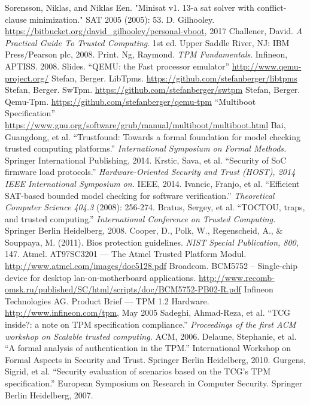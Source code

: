 \documentclass[12pt,lot, lof]{puthesis}
\begin{document}
\begin{flushleft}
\begin{footnotesize}
\begin{thebibliography}{\kern\bibindent}
    Sorensson, Niklas, and Niklas Een. "Minisat v1. 13-a sat solver with conflict-clause minimization." SAT 2005 (2005): 53.
    D. Gilhooley. \url{https://bitbucket.org/david\_gilhooley/personal-vboot}, 2017
    Challener, David. \textit{A Practical Guide To Trusted Computing}. 1st ed. Upper Saddle River, NJ: IBM Press/Pearson plc, 2008. Print.
    Ng, Raymond. \textit{TPM Fundamentals}. Infineon, APTISS. 2008. Slides.
    ``QEMU: the Fast processor emulator'' \url{http://www.qemu-project.org/}
    Stefan, Berger. LibTpms. \url{https://github.com/stefanberger/libtpms}
    Stefan, Berger. SwTpm. \url{https://github.com/stefanberger/swtpm}
    Stefan, Berger. Qemu-Tpm. \url{https://github.com/stefanberger/qemu-tpm}
    ``Multiboot Specification'' \url{https://www.gnu.org/software/grub/manual/multiboot/multiboot.html}
    Bai, Guangdong, et al. ``Trustfound: Towards a formal foundation for model checking trusted computing platforms.'' \textit{International Symposium on Formal Methods.} Springer International Publishing, 2014.
    Krstic, Sava, et al. ``Security of SoC firmware load protocols.''
    \textit{Hardware-Oriented Security and Trust (HOST), 2014 IEEE International Symposium on.} IEEE, 2014.
    Ivancic, Franjo, et al. ``Efficient SAT-based bounded model checking for software verification.'' \textit{Theoretical Computer Science 404.3} (2008): 256-274.
    Bratus, Sergey, et al. ``TOCTOU, traps, and trusted computing.'' \textit{International Conference on Trusted Computing.} Springer Berlin Heidelberg, 2008.
    Cooper, D., Polk, W., Regenscheid, A., \& Souppaya, M. (2011). Bios protection guidelines. \textit{NIST Special Publication, 800,} 147.
     Atmel. AT97SC3201 — The Atmel Trusted Platform Modul. \url{http://www.atmel.com/images/doc5128.pdf}
Broadcom. BCM5752 -- Single-chip device for desktop lan-on-motherboard applications. \url{http://www.recomb-omsk.ru/published/SC/html/scripts/doc/BCM5752-PB02-R.pdf}
    Infineon Technologies AG. Product Brief — TPM 1.2 Hardware. \url{http://www.infineon.com/tpm}, May 2005
    Sadeghi, Ahmad-Reza, et al. ``TCG inside?: a note on TPM specification compliance.'' \textit{Proceedings of the first ACM workshop on Scalable trusted computing.} ACM, 2006.
    Delaune, Stephanie, et al. ``A formal analysis of authentication in the TPM.'' International Workshop on Formal Aspects in Security and Trust. Springer Berlin Heidelberg, 2010.
        Gurgens, Sigrid, et al. ``Security evaluation of scenarios based on the TCG’s TPM specification.'' European Symposium on Research in Computer Security. Springer Berlin Heidelberg, 2007.
\end{thebibliography}
\end{footnotesize}
\end{flushleft}
\end{document}
